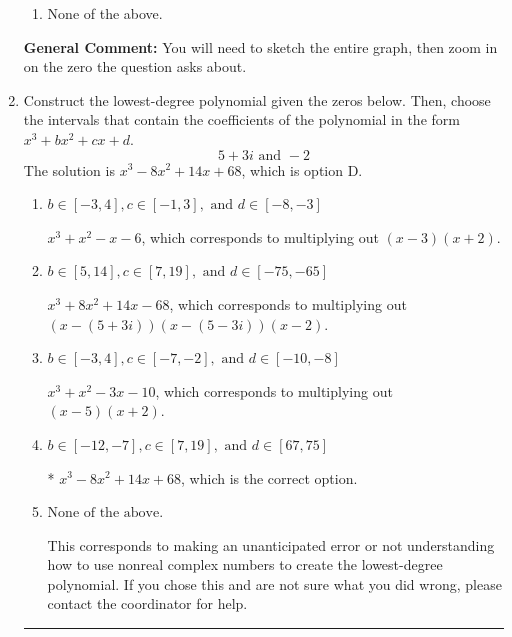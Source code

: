 \documentclass{extbook}[14pt]
\newcommand{\litem}[1]{\item #1

\rule{\textwidth}{0.4pt}}
\begin{document}
\begin{enumerate}
{\begin{enumerate}[label=\Alph*.]
\item None of the above.\end{enumerate}
\textbf{General Comment:} You will need to sketch the entire graph, then zoom in on the zero the question asks about.
}
\litem{
Construct the lowest-degree polynomial given the zeros below. Then, choose the intervals that contain the coefficients of the polynomial in the form $x^3+bx^2+cx+d$.
\[ 5 + 3 i \text{ and } -2 \]The solution is \( x^{3} -8 x^{2} +14 x + 68 \), which is option D.\begin{enumerate}[label=\Alph*.]
\item \( b \in [-3, 4], c \in [-1, 3], \text{ and } d \in [-8, -3] \)

$x^{3} + x^{2} -x -6$, which corresponds to multiplying out $(x -3)(x + 2)$.
\item \( b \in [5, 14], c \in [7, 19], \text{ and } d \in [-75, -65] \)

$x^{3} +8 x^{2} +14 x -68$, which corresponds to multiplying out $(x-(5 + 3 i))(x-(5 - 3 i))(x -2)$.
\item \( b \in [-3, 4], c \in [-7, -2], \text{ and } d \in [-10, -8] \)

$x^{3} + x^{2} -3 x -10$, which corresponds to multiplying out $(x -5)(x + 2)$.
\item \( b \in [-12, -7], c \in [7, 19], \text{ and } d \in [67, 75] \)

* $x^{3} -8 x^{2} +14 x + 68$, which is the correct option.
\item \( \text{None of the above.} \)

This corresponds to making an unanticipated error or not understanding how to use nonreal complex numbers to create the lowest-degree polynomial. If you chose this and are not sure what you did wrong, please contact the coordinator for help.
\end{enumerate}

}
\end{enumerate}
\end{document}
